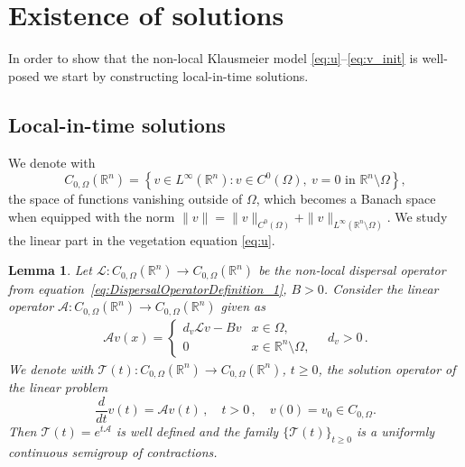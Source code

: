 \documentclass[11pt, a4paper]{article}
\theoremstyle{break}
\theoremstyle{break}
\theoremstyle{break}
\theoremstyle{break}
\theoremstyle{break}
\newtheorem{lem}{Lemma}[section]
\theoremstyle{break}
\theoremstyle{break}
\theoremstyle{break}
\theoremstyle{break}
\theoremstyle{break}
\begin{document}
\section{Existence of solutions}
In order to show that the non-local Klausmeier model \eqref{eq:u}--\eqref{eq:v_init} is well-posed we start by constructing local-in-time solutions. 

\subsection{Local-in-time solutions} 
We denote with 
\begin{equation}
    \label{EQ:C_0_OMEGA}
    C_{0, \Omega}(\mathbb{R}^n) = \left\{ v \in L^\infty(\mathbb{R}^n): v \in C^0(\Omega), \: v = 0 \text{ in } \mathbb{R}^n \setminus \Omega \right\},
\end{equation}
the space of functions vanishing outside of $\Omega$, which becomes a Banach space when equipped with the norm $\|v\|= \|v\|_{C^0(\Omega)} + \|v\|_{L^\infty(\mathbb{R}^n\setminus \Omega)}$. We study the linear part in the vegetation equation \eqref{eq:u}.  

\begin{lem} 
Let $\mathcal{L}:  C_{0, \Omega}(\mathbb{R}^n) \to C_{0, \Omega}(\mathbb{R}^n)$ be the non-local dispersal operator from equation~\eqref{eq:DispersalOperatorDefinition_1}, $B>0$.
Consider the linear operator $\mathcal{A}: C_{0, \Omega}(\mathbb{R}^n) \to C_{0, \Omega}(\mathbb{R}^n)$ given as
\begin{align}
    \label{EQ:A_OPERATOR_DEFINITION}
    \mathcal{A} v (x) =
    \begin{cases}
        d_v\mathcal{L}v - Bv &x \in \Omega, \\
        0 &x \in \mathbb{R}^n \setminus \Omega,
    \end{cases} \quad d_v >0 \,.
\end{align} 
We denote with $\mathcal{T}(t) : C_{0, \Omega} (\mathbb{R}^n) \to  C_{0, \Omega} (\mathbb{R}^n)$, $t \geq 0$, the solution operator of the linear problem 
    \begin{equation}
        \label{eq:v_semilinear_problem}
        \frac{d}{dt} v(t) = \mathcal{A} v (t) \,, \quad t > 0 \,, \quad  v(0) = v_0 \in C_{0, \Omega}.
    \end{equation}
Then $\mathcal{T}(t) = e^{t\mathcal{A}}$ is well defined and the family $\{\mathcal{T}(t)\}_{t \geq 0}$ is a uniformly continuous semigroup of contractions.
    \label{lem:A_SEMIGROUP_GENERATOR}
\end{lem}
\end{document}
